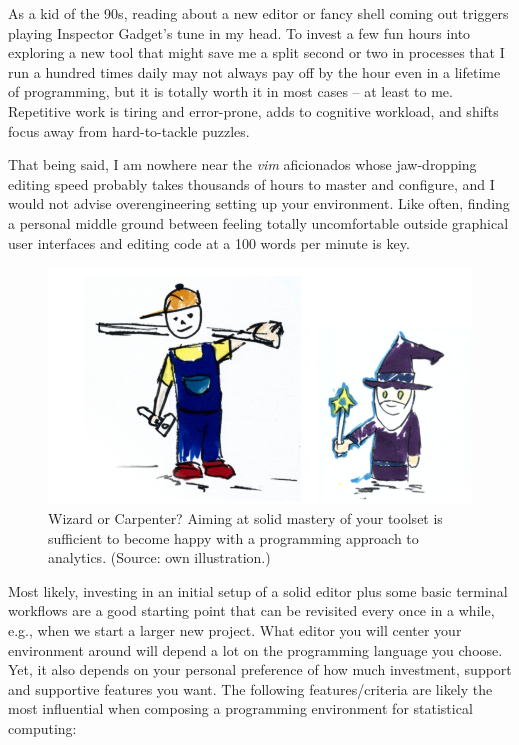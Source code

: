 \documentclass[
  12pt,
  letterpaper,
]{krantz}
\begin{document}
As a kid of the 90s, reading about a new editor or fancy shell coming
out triggers playing Inspector Gadget's tune in my head. To invest a few
fun hours into exploring a new tool that might save me a split second or
two in processes that I run a hundred times daily may not always pay off
by the hour even in a lifetime of programming, but it is totally worth
it in most cases -- at least to me. Repetitive work is tiring and
error-prone, adds to cognitive workload, and shifts focus away from
hard-to-tackle puzzles.

That being said, I am nowhere near the \emph{vim} aficionados whose
jaw-dropping editing speed probably takes thousands of hours to master
and configure, and I would not advise overengineering setting up your
environment. Like often, finding a personal middle ground between
feeling totally uncomfortable outside graphical user interfaces and
editing code at a 100 words per minute is key.

\begin{figure}

{\centering \includegraphics{./images/wizardry.jpg}

}

\caption{Wizard or Carpenter? Aiming at solid mastery of your toolset is
sufficient to become happy with a programming approach to analytics.
(Source: own illustration.)}

\end{figure}

Most likely, investing in an initial setup of a solid editor plus some
basic terminal workflows are a good starting point that can be revisited
every once in a while, e.g., when we start a larger new project. What
editor you will center your environment around will depend a lot on the
programming language you choose. Yet, it also depends on your personal
preference of how much investment, support and supportive features you
want. The following features/criteria are likely the most influential
when composing a programming environment for statistical computing:
\end{document}
